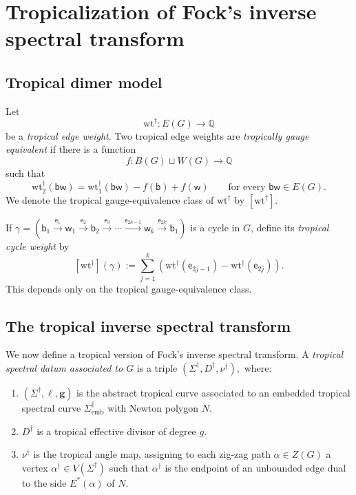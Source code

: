 \documentclass[12pt]{amsart}
\numberwithin{equation}{section}
\theoremstyle{definition}
\def\Gtor{G}
\def\vertices{V}
\def\blackvertices{B}
\def\whitevertices{W}
\def\edges{E}
\newcommand{\wt}{\mathrm{wt}}
\def\divisor{D}
\def\trop{\dagger}
\def\bw{\mathsf{w}}
\def\bb{\mathsf{b}}
\def\be{{\mathsf{e}}}
\def\zzG{{{Z}(G)}}
\def\divisor{D}
\def\Eside{{E^\ast}}
\def\Q{\mathbb{Q}}
\def\mcurve{\Sigma}
\def\tropmcurve{\mcurve^\trop}
\begin{document}
\section{Tropicalization of Fock's inverse spectral transform}
\label{sec:tropical_fock_weights}



\subsection{Tropical dimer model}

Let
\[
\wt^\trop:\edges(\Gtor)\rightarrow\Q
\]
be a \emph{tropical edge weight}.  Two tropical edge weights are
\emph{tropically gauge equivalent} if there is a function
\[
f:\blackvertices(\Gtor)\sqcup\whitevertices(\Gtor)\rightarrow\Q
\]
such that
\[
\wt_2^\trop(\bb\bw)
=
\wt_1^\trop(\bb\bw)-f(\bb)+f(\bw)
\qquad
\text{for every }\bb\bw\in\edges(\Gtor).
\]
We denote the tropical gauge-equivalence class of $\wt^\trop$ by
$[\wt^\trop]$.

If
$
\gamma
=
(\bb_1\xrightarrow{\be_1}\bw_1
\xrightarrow{\be_2}\bb_2
\xrightarrow{\be_3}\cdots
\xrightarrow{\be_{2k-1}}\bw_k
\xrightarrow{\be_{2k}}\bb_1)
$
is a cycle in $\Gtor$, define its \emph{tropical cycle weight} by
\[
[\wt^\trop](\gamma)
:=
\sum_{j=1}^k
\left(
\wt^\trop(\be_{2j-1})
-
\wt^\trop(\be_{2j})
\right).
\]
This depends only on the tropical gauge-equivalence class.


\subsection{The tropical inverse spectral transform}

We now define a tropical version of Fock's inverse spectral
transform. A \emph{tropical spectral datum associated to $\Gtor$} is a triple
$
(
\tropmcurve,\divisor^\trop,\nu^\trop
),
$
where:
\begin{enumerate}
\item
$(\tropmcurve,\ell,\bm g)$ is the abstract tropical curve
associated to an embedded tropical spectral curve
$\tropmcurve_{\mathrm{emb}}$ with Newton polygon $N$.

\item
$\divisor^\trop$ is a tropical effective
divisor of degree $g$.

\item
$\nu^\trop$ is the tropical angle map, assigning to each zig-zag path
$\alpha\in\zzG$ a vertex
$\alpha^\trop\in \vertices(\tropmcurve)$ such that $\alpha^\trop$ is the endpoint of an unbounded edge dual to the side $\Eside(\alpha)$ of $N$.
\end{enumerate}
\end{document}

